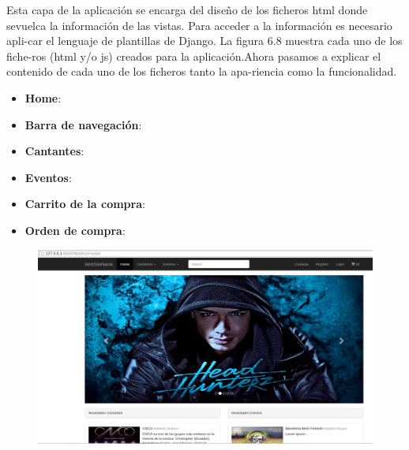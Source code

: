 \documentclass[notes,slidesec,a4]{seminar}
\begin{document}
\begin{hslide}
Esta capa de la aplicación se encarga del diseño de los ficheros html donde sevuelca la información de las vistas. Para acceder a la información es necesario apli-car el lenguaje de plantillas de Django. La figura 6.8 muestra cada uno de los fiche-ros (html y/o js) creados para la aplicación.Ahora pasamos a explicar el contenido de cada uno de los ficheros tanto la apa-riencia como la funcionalidad.
\begin{itemize}
\item \textbf{Home}:
\item \textbf{Barra de navegación}:
\item \textbf{Cantantes}:
\item \textbf{Eventos}:
\item \textbf{Carrito de la compra}:
\item \textbf{Orden de compra}:
\end{itemize}
\begin{minipage}{8cm}
\begin{center}
\begin{figure}
\includegraphics[width=11.5cm]{img/Page_1.png}
\end{figure}
\end{center}
\end{minipage}
\end{hslide}

\begin{hslide}
\end{hslide}

\end{document}
